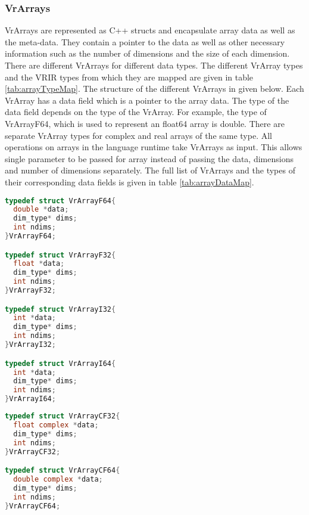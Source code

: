\subsubsection{VrArrays}
VrArrays are represented as C++ structs and encapsulate array data as well as the meta-data. They contain a pointer to the data as well as other necessary information such as the number of dimensions and the size of each dimension. There are different VrArrays for different data types. The different VrArray types and the VRIR types from which they are mapped are given in table \ref{tab:arrayTypeMap}. The structure of the different VrArrays in given below. Each VrArray has a data field which is a pointer to the array data. The type of the data field depends on the type of the VrArray. For example, the type of VrArrayF64, which is used to represent an float64 array is double. 
There are separate VrArray types for complex and real arrays of the same type. All operations on arrays in the language runtime take VrArrays as input. This allows single parameter to be passed for array instead of passing the data, dimensions and number of dimensions separately. The full list of VrArrays and the types of their corresponding data fields is given in table \ref{tab:arrayDataMap}.
\begin{lstlisting}[float,language=c, label={vrArrayF64Struct}, caption={Structures of VrArrays for real data}]
typedef struct VrArrayF64{
  double *data;
  dim_type* dims;  
  int ndims;
}VrArrayF64;

typedef struct VrArrayF32{
  float *data;
  dim_type* dims;  
  int ndims;
}VrArrayF32;

typedef struct VrArrayI32{
  int *data;
  dim_type* dims;  
  int ndims;
}VrArrayI32;

typedef struct VrArrayI64{
  int *data;
  dim_type* dims;  
  int ndims;
}VrArrayI64;

\end{lstlisting}

\begin{lstlisting}[float,language=c, label={vrArrayF64Struct}, caption={Structures of VrArrays for complex data}]
typedef struct VrArrayCF32{
  float complex *data;
  dim_type* dims;  
  int ndims;
}VrArrayCF32;

typedef struct VrArrayCF64{
  double complex *data;
  dim_type* dims;  
  int ndims;
}VrArrayCF64;
\end{lstlisting}

